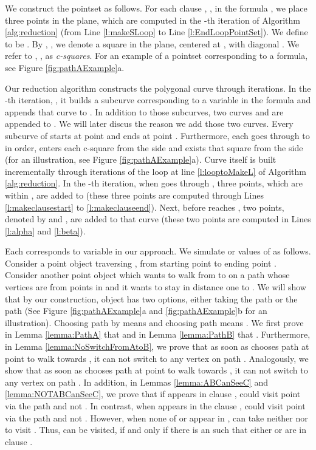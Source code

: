 \documentclass[12pt]{dalthesis}
\begin{document}
We construct the pointset  as follows.
For each clause , , in the formula , 
we place three points  in the plane, which are computed
in the -th iteration of Algorithm \ref{alg:reduction} (from Line \ref{l:makeSLoop} to Line \ref{l:EndLoopPointSet}).
We define  to be .
By , , we denote
a square in the plane, centered at , 
with diagonal . 
We refer to , , as
{\em c-squares}. 
For an example of a pointset  corresponding to a formula, 
see Figure \ref{fig:pathAExample}a.


Our reduction algorithm constructs the polygonal curve  
through  iterations. In  the -th iteration, ,
it builds a subcurve  corresponding to  a variable 
 in the formula  and appends that curve to .
In addition to those  subcurves, two curves 
 and  are appended to . 
We will later discus the reason we add those 
two curves. Every subcurve   of  starts at point  
and ends at point .
Furthermore, each   goes through
 to  in order, enters each c-square  from
the side   and exists that square from 
the side   (for an illustration, see Figure \ref{fig:pathAExample}a). 
Curve  itself is built incrementally  
through iterations of the loop at line \ref{l:looptoMakeL} 
of Algorithm \ref{alg:reduction}. 
In the -th iteration, when  goes through ,
three points, which are within  , are added to  
(these three points are computed through Lines 
\ref{l:makeclausestart} to \ref{l:makeclauseend}).
Next, before  reaches  ,
two points,  denoted by  and , are added to that curve 
(these two points are computed in Lines \ref{l:alpha} 
and \ref{l:beta}).


Each  corresponds to variable  in our approach.
We simulate  or  values of 
as follows.
Consider a point object  
traversing , from starting point  to ending point . 
Consider 
another point object  which wants to 
walk from  to 
on a path whose vertices are from points in  and it wants to stay in distance one 
to . We will show that 
by our construction, object  has two options, either taking 
the path  or the path  
(See Figure \ref{fig:pathAExample}a and \ref{fig:pathAExample}b for an illustration). 
Choosing path  by  means  and choosing path  means .
We first prove in Lemma \ref{lemma:PathA} that  and 
in Lemma  \ref{lemma:PathB} that .
Furthermore, in
Lemma \ref{lemma:NoSwitchFromAtoB}, we prove that as soon as  chooses 
path  at point  to walk towards , 
it can not switch to any vertex on path .
Analogously, we show that as soon as  chooses path  at point  to walk towards , 
it can not switch to any vertex on path .
In addition, in Lemmas \ref{lemma:ABCanSeeC} and \ref{lemma:NOTABCanSeeC}, we prove that 
if  appears in clause ,
 could visit point  via the path  and not . In contrast, 
when  appears in the clause ,
 could visit point  via the path  and not .
However, when none of   or  appear 
in ,  can take neither  nor  to visit .
Thus,  can be visited, 
if and only if there is 
an  such that 
either  or 
 are in clause .
\end{document}
